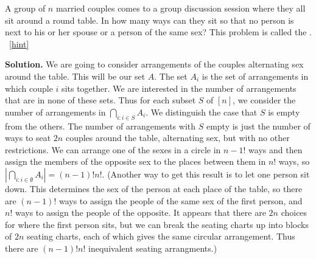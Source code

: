 \documentclass{book}
\begin{document}
\setcounter{project}{227}
\addtocounter{project}{-1}
\begin{activity}[]\label{activity-220}
\hypertarget{p-1278}{}%
A group of \(n\) married couples comes to a group discussion session where they all sit around a round table. In how many ways can they sit so that no person is next to his or her spouse or a person of the same sex? This problem is called the .%
~\hfill{\tiny\hyperlink{a-227}{[hint]}\hypertarget{q-227}{}}\par\smallskip%
\noindent\textbf{Solution.}\hypertarget{solution-163}{}\quad%
\hypertarget{p-1281}{}%
We are going to consider arrangements of the couples alternating sex around the table. This will be our set \(A\). The set \(A_i\) is the set of arrangements in which couple \(i\) sits together. We are interested in the number of arrangements that are in none of these sets. Thus for each subset \(S\) of \([n]\), we consider the number of arrangements in \(\displaystyle\bigcap_{i\colon i\in S} A_i\). We distinguish the case that \(S\) is empty from the others. The number of arrangements with \(S\) empty is just the number of ways to seat \(2n\) couples around the table, alternating sex, but with no other restrictions. We can arrange one of the sexes in a circle in \(n-1!\) ways and then assign the members of the opposite sex to the places between them in \(n!\) ways, so \(\displaystyle \left|\bigcap_{i\colon i\in \emptyset} A_i \right| = (n-1)!n!\). (Another way to get this result is to let one person sit down. This determines the sex of the person at each place of the table, so there are \((n-1)!\) ways to assign the people of the same sex of the first person, and \(n!\) ways to assign the people of the opposite. It appears that there are \(2n\) choices for where the first person sits, but we can break the seating charts up into blocks of \(2n\) seating charts, each of which gives the same circular arrangement. Thus there are \((n-1)!n!\) inequivalent seating arrangments.)%
\par
\hypertarget{p-1282}{}%

\end{activity}
\end{document}
